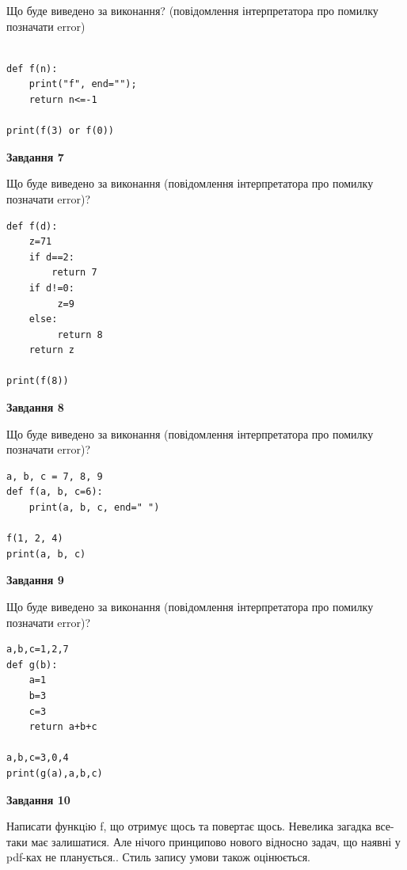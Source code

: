 \documentclass[12pt, ukrainian]{article}
\begin{document}
{\begin {large}
Що буде виведено за виконання? (повідомлення інтерпретатора про помилку позначати error)\par
\begin{verbatim}

def f(n):
    print("f", end="");
    return n<=-1

print(f(3) or f(0))
\end{verbatim}

{\begin {center}\textbf{Завдання 7}\end {center}}

Що буде виведено за виконання (повідомлення інтерпретатора про помилку позначати error)?\par
\begin{verbatim}
def f(d):
    z=71
    if d==2: 
        return 7
    if d!=0:
         z=9
    else:
         return 8
    return z

print(f(8))
\end{verbatim}

{\begin {center}\textbf{Завдання 8}\end {center}}

Що буде виведено за виконання (повідомлення інтерпретатора про помилку позначати error)?\par
\begin{verbatim}
a, b, c = 7, 8, 9
def f(a, b, c=6):
    print(a, b, c, end=" ")

f(1, 2, 4)
print(a, b, c)
\end{verbatim}

{\begin {center}\textbf{Завдання 9}\end {center}}

Що буде виведено за виконання (повідомлення інтерпретатора про помилку позначати error)?\par
\begin{verbatim}
a,b,c=1,2,7
def g(b):
    a=1
    b=3
    c=3
    return a+b+c

a,b,c=3,0,4
print(g(a),a,b,c)
\end{verbatim}

{\begin {center}\textbf{Завдання 10}\end {center}}


Написати функцiю f, що отримує щось та повертає щось. Невелика загадка все-таки має залишатися. Але нічого принципово нового відносно задач, що наявні у pdf-ках не планується.. Стиль запису умови також оцінюється.\par
\end {large}}
\newpage
\end{document}

